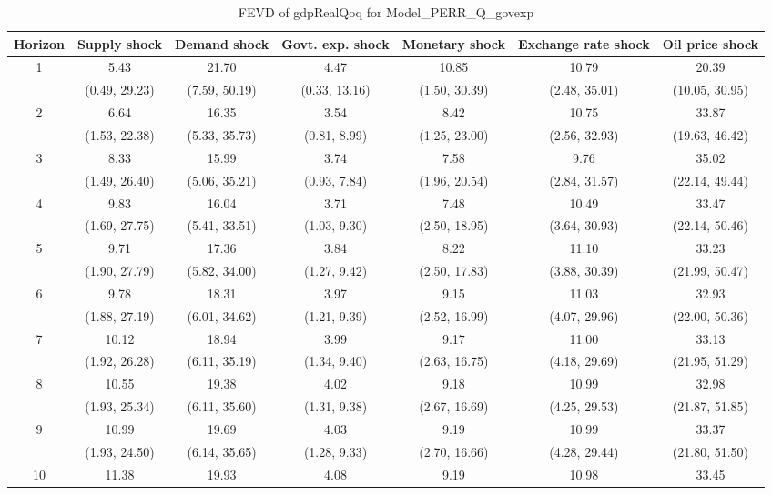 \documentclass{article}
\begin{document}
\begin{table}
	\footnotesize
	\caption{FEVD of gdpRealQoq for Model_PERR_Q_govexp}
	\begin{tabular}{ccccccc}
		Horizon & Supply shock & Demand shock & Govt. exp. shock & Monetary shock & Exchange rate shock & Oil price shock\\ \hline
		\multirow{2}{*}{1} & 5.43 & 21.70 & 4.47 & 10.85 & 10.79 & 20.39\\
		 & (0.49, 29.23) & (7.59, 50.19) & (0.33, 13.16) & (1.50, 30.39) & (2.48, 35.01) & (10.05, 30.95)\\
		\multirow{2}{*}{2} & 6.64 & 16.35 & 3.54 & 8.42 & 10.75 & 33.87\\
		 & (1.53, 22.38) & (5.33, 35.73) & (0.81, 8.99) & (1.25, 23.00) & (2.56, 32.93) & (19.63, 46.42)\\
		\multirow{2}{*}{3} & 8.33 & 15.99 & 3.74 & 7.58 & 9.76 & 35.02\\
		 & (1.49, 26.40) & (5.06, 35.21) & (0.93, 7.84) & (1.96, 20.54) & (2.84, 31.57) & (22.14, 49.44)\\
		\multirow{2}{*}{4} & 9.83 & 16.04 & 3.71 & 7.48 & 10.49 & 33.47\\
		 & (1.69, 27.75) & (5.41, 33.51) & (1.03, 9.30) & (2.50, 18.95) & (3.64, 30.93) & (22.14, 50.46)\\
		\multirow{2}{*}{5} & 9.71 & 17.36 & 3.84 & 8.22 & 11.10 & 33.23\\
		 & (1.90, 27.79) & (5.82, 34.00) & (1.27, 9.42) & (2.50, 17.83) & (3.88, 30.39) & (21.99, 50.47)\\
		\multirow{2}{*}{6} & 9.78 & 18.31 & 3.97 & 9.15 & 11.03 & 32.93\\
		 & (1.88, 27.19) & (6.01, 34.62) & (1.21, 9.39) & (2.52, 16.99) & (4.07, 29.96) & (22.00, 50.36)\\
		\multirow{2}{*}{7} & 10.12 & 18.94 & 3.99 & 9.17 & 11.00 & 33.13\\
		 & (1.92, 26.28) & (6.11, 35.19) & (1.34, 9.40) & (2.63, 16.75) & (4.18, 29.69) & (21.95, 51.29)\\
		\multirow{2}{*}{8} & 10.55 & 19.38 & 4.02 & 9.18 & 10.99 & 32.98\\
		 & (1.93, 25.34) & (6.11, 35.60) & (1.31, 9.38) & (2.67, 16.69) & (4.25, 29.53) & (21.87, 51.85)\\
		\multirow{2}{*}{9} & 10.99 & 19.69 & 4.03 & 9.19 & 10.99 & 33.37\\
		 & (1.93, 24.50) & (6.14, 35.65) & (1.28, 9.33) & (2.70, 16.66) & (4.28, 29.44) & (21.80, 51.50)\\
		\multirow{2}{*}{10} & 11.38 & 19.93 & 4.08 & 9.19 & 10.98 & 33.45\\

\end{tabular}
\end{table}
\end{document}
